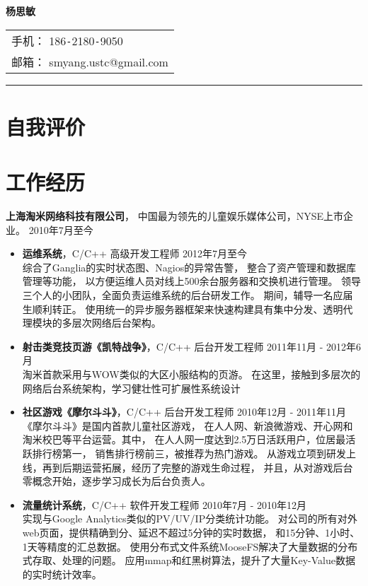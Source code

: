 \documentclass[margin]{res}
\newcommand{\taomee}{上海淘米网络科技有限公司}
\begin{document}
{\bfseries \huge 杨思敏}
\hfill
\begin{tabular}{l}
    手机： 186\texttt{-}2180\texttt{-}9050\\
    邮箱： {smyang.ustc@gmail.com}
\end{tabular}
\rule{\columnwidth}{1pt}

\section{自我评价}

\section{工作经历}
{\bf \large \taomee}，
中国最为领先的儿童娱乐媒体公司，NYSE上市企业。
\hfill 2010年7月至今\\[1mm]
\begin{itemize}
    \item {\bf 运维系统}，C/C++ 高级开发工程师 
        \hfill 2012年7月至今\\[1mm]
        综合了Ganglia的实时状态图、Nagios的异常告警，
        整合了资产管理和数据库管理等功能，
        以方便运维人员对线上500余台服务器和交换机进行管理。
        领导三个人的小团队，全面负责运维系统的后台研发工作。
        期间，辅导一名应届生顺利转正。
        使用统一的异步服务器框架来快速构建具有集中分发、透明代理模块的多层次网络后台架构。
        \\
    \item {\bf 射击类竞技页游《凯特战争》}，C/C++ 后台开发工程师 
        \hfill 2011年11月 - 2012年6月\\[1mm]
        淘米首款采用与WOW类似的大区小服结构的页游。
        在这里，接触到多层次的网络后台系统架构，学习健壮性可扩展性系统设计
        \\
    \item {\bf 社区游戏《摩尔斗斗》}，C/C++ 后台开发工程师 
        \hfill 2010年12月 - 2011年11月\\[1mm]
        《摩尔斗斗》是国内首款儿童社区游戏，
        在人人网、新浪微游戏、开心网和淘米校巴等平台运营。其中，
        在人人网一度达到2.5万日活跃用户，位居最活跃排行榜第一，
        销售排行榜前三，被推荐为热门游戏。
        从游戏立项到研发上线，再到后期运营拓展，经历了完整的游戏生命过程，
        并且，从对游戏后台零概念开始，逐步学习成长为后台负责人。
        \\
   \item {\bf 流量统计系统}，C/C++ 软件开发工程师 
       \hfill 2010年7月 - 2010年12月\\[1mm]
       实现与Google Analytics类似的PV/UV/IP分类统计功能。
       对公司的所有对外web页面，提供精确到分、延迟不超过5分钟的实时数据，
       和15分钟、1小时、1天等精度的汇总数据。
       使用分布式文件系统MooseFS解决了大量数据的分布式存取、处理的问题。
       应用mmap和红黑树算法，提升了大量Key-Value数据的实时统计效率。



\end{itemize}
\end{document}
